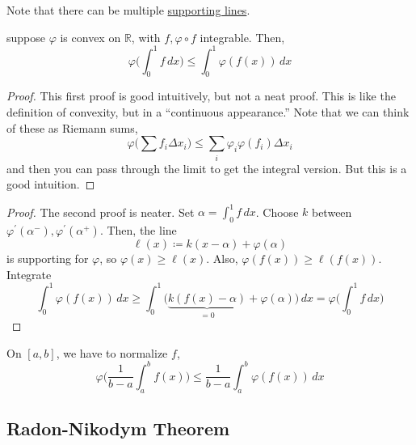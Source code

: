   Note that there can be multiple \hyperref[def:supporting-line]{supporting lines}. 

  \begin{theorem}
    \label{thm:jensens-inequality}
    suppose $\varphi$ is convex on $\mathbb{R}$, with $f, \varphi \circ f$ integrable. Then, 
    \begin{equation}
      \varphi \bigg( \int_0^1 f \,dx \bigg) \leq \int_0^1 \varphi (f(x)) \,dx
    \end{equation}
  \end{theorem}
  \begin{proof}
    This first proof is good intuitively, but not a neat proof.  This is like the definition of convexity, but in a ``continuous  appearance.'' Note that we can think of these as Riemann sums, 
    \begin{equation}
      \varphi \bigg( \sum f_i \Delta x_i \bigg) \leq \sum_{i} \varphi_i \varphi(f_i) \Delta x_i
    \end{equation}
    and then you can pass through the limit to get the integral version. But this is a good intuition. 
  \end{proof}
  \begin{proof}
    The second proof is neater. Set $\alpha = \int_0^1 f\,dx$. Choose $k$ between $\varphi^\prime (\alpha^-), \varphi^\prime (\alpha^+)$. Then, the line 
    \begin{equation}
      \ell(x) \coloneqq k (x - \alpha) + \varphi(\alpha) 
    \end{equation}
    is supporting for $\varphi$, so $\varphi(x) \geq \ell(x)$. Also, $\varphi(f(x)) \geq \ell (f(x))$. Integrate 
    \begin{equation}
      \int_0^1 \varphi (f(x)) \,dx \geq \int_0^1 \Big( \underbrace{k (f(x) - \alpha)}_{= 0} + \varphi(\alpha) \Big) \,dx = \varphi \bigg( \int_0^1 f\,dx \bigg)
    \end{equation}
  \end{proof} 

  On $[a, b]$, we have to normalize $f$, 
  \begin{equation}
    \varphi \bigg( \frac{1}{b - a} \int_a^b f(x) \bigg) \leq \frac{1}{b - a} \int_a^b \varphi (f(x)) \,dx
  \end{equation}

\subsection{Radon-Nikodym Theorem} 

